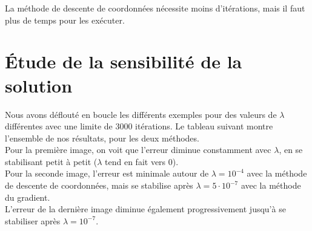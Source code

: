 \documentclass[12pt, a4paper]{report}
\begin{document}
La méthode de descente de coordonnées nécessite moins d'itérations, mais il faut plus de temps pour les exécuter. \\


\section{Étude de la sensibilité de la solution}
Nous avons déflouté en boucle les différents exemples pour des valeurs de $\lambda$ différentes avec une limite de 3000 itérations. Le tableau suivant montre l'ensemble de nos résultats, pour les deux méthodes. \\

Pour la première image, on voit que l'erreur diminue constamment avec $\lambda$, en se stabilisant petit à petit ($\lambda$ tend en fait vers 0). \\
Pour la seconde image, l'erreur est minimale autour de $\lambda = 10^{-4}$ avec la méthode de descente de coordonnées, mais se stabilise après $\lambda = 5\cdot10^{-7}$ avec la méthode du gradient. \\
L'erreur de la dernière image diminue également progressivement jusqu'à se stabiliser après $\lambda = 10^{-7}$.
\end{document}
